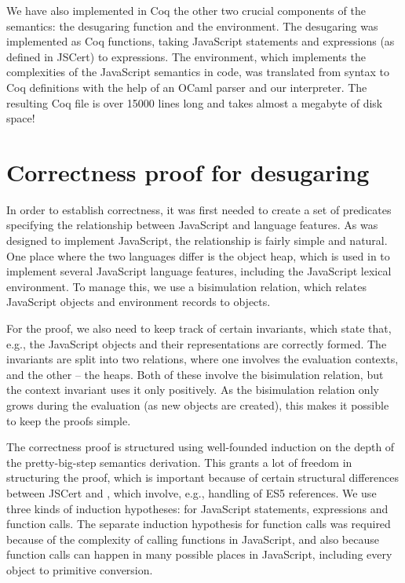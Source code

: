 \documentclass{llncs}
\begin{document}
We have also implemented in Coq the other two crucial components
of the \lambdajs semantics: the desugaring function and the 
environment. The desugaring was implemented as Coq functions,
taking JavaScript statements and expressions (as defined in
JSCert) to \lambdajs expressions. The environment, which
implements the complexities of the JavaScript semantics
in \lambdajs code, was translated from \lambdajs syntax
to Coq definitions with the help of an OCaml parser and
our interpreter. The resulting Coq file is over 15000 lines long
and takes almost a megabyte of disk space!

\section{Correctness proof for \lambdajs desugaring}

In order to establish correctness, it was first needed to create
a set of predicates specifying the relationship between 
JavaScript and \lambdajs language features. As \lambdajs was
designed to implement JavaScript, the relationship is fairly
simple and natural. One place where the two languages differ
is the object heap, which is used in \lambdajs to implement
several JavaScript language features, including the
JavaScript lexical environment. To manage this, we use a bisimulation
relation, which relates JavaScript objects and environment records
to \lambdajs objects.

For the proof, we also need to keep track of certain invariants,
which state that, e.g., the JavaScript objects and their
\lambdajs representations are correctly formed. 
The invariants are split into two relations, where one
involves the evaluation contexts, and the other -- the heaps.
Both of these involve the bisimulation relation, but the
context invariant uses it only positively. As the bisimulation
relation only grows during the evaluation (as new objects
are created), this makes it possible to keep the proofs simple.

The correctness proof is structured using well-founded 
induction on the depth of the \lambdajs pretty-big-step
semantics derivation. This grants a lot of freedom in structuring
the proof, which is important because of certain structural
differences between JSCert and \lambdajs, which involve,
e.g., handling of ES5 references. We use three kinds of induction
hypotheses: for JavaScript statements, expressions and
function calls. The separate induction hypothesis for function
calls was required because of the complexity of calling functions
in JavaScript, and also because function calls can happen in
many possible places in JavaScript, including every
object to primitive conversion.
\end{document}
